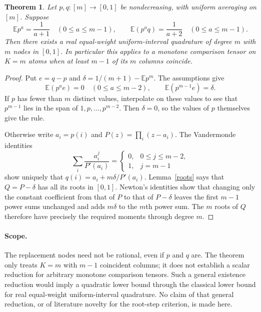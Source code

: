 \documentclass[11pt]{article}
\newtheorem{theorem}[lemma]{Theorem}
\newcommand{\E}{\mathbb E}
\begin{document}
\begin{theorem}\label{completion}
Let $p,q:[m]\to[0,1]$ be nondecreasing, with uniform averaging on
$[m]$. Suppose
\[
 \E p^a=\frac1{a+1}\quad(0\le a\le m-1),
 \qquad
 \E(p^a q)=\frac1{a+2}\quad(0\le a\le m-1).
\]
Then there exists a real equal-weight uniform-interval quadrature of
degree $m$ with $m$ nodes in $[0,1]$.
In particular this applies to a monotone comparison tensor on $K=m$
atoms when at least $m-1$ of its $m$ columns coincide.
\end{theorem}
\begin{proof}
Put $e=q-p$ and $\delta=1/(m+1)-\E p^m$. The assumptions give
\[
 \E(p^a e)=0\quad(0\le a\le m-2),
 \qquad \E(p^{m-1}e)=\delta.
\]
If $p$ has fewer than $m$ distinct values, interpolate on these values
to see that $p^{m-1}$ lies in the span of $1,p,\ldots,p^{m-2}$.
Then $\delta=0$, so the values of $p$ themselves give the rule.

Otherwise write $a_i=p(i)$ and $P(z)=\prod_i(z-a_i)$.
The Vandermonde identities
\[
 \sum_i\frac{a_i^j}{P'(a_i)}=
 \begin{cases}0,&0\le j\le m-2,\\1,&j=m-1\end{cases}
\]
show uniquely that $q(i)=a_i+m\delta/P'(a_i)$.
Lemma~\ref{roots} says that $Q=P-\delta$ has all its roots in $[0,1]$.
Newton's identities show that changing only the constant coefficient
from that of $P$ to that of $P-\delta$ leaves the first $m-1$ power
sums unchanged and adds $m\delta$ to the $m$th power sum.
The $m$ roots of $Q$ therefore have precisely the required moments
through degree $m$.
\end{proof}

\paragraph{Scope.}
The replacement nodes need not be rational, even if $p$ and $q$ are.
The theorem only treats $K=m$ with $m-1$ coincident columns; it does
not establish a scalar reduction for arbitrary monotone comparison
tensors. Such a general existence reduction would imply a quadratic
lower bound through the classical lower bound for real equal-weight
uniform-interval quadrature. No claim of that general reduction, or
of literature novelty for the root-step criterion, is made here.
\end{document}
